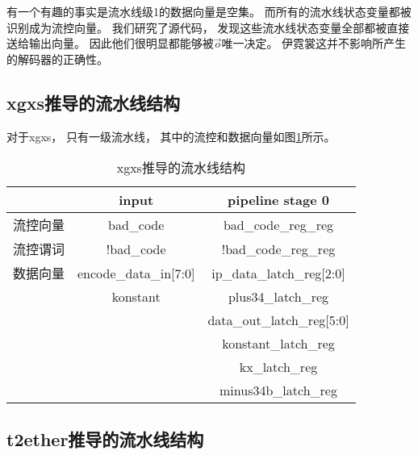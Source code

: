 有一个有趣的事实是流水线级1的数据向量是空集。
而所有的流水线状态变量都被识别成为流控向量。
我们研究了源代码，
发现这些流水线状态变量全部都被直接送给输出向量。
因此他们很明显都能够被$\vec{o}$唯一决定。
伊霓裳这并不影响所产生的解码器的正确性。



\subsection{xgxs推导的流水线结构}


对于xgxs，
只有一级流水线，
其中的流控和数据向量如图\ref{tab_xgxs}所示。

\begin{table}[b]
\centering
\caption{xgxs推导的流水线结构}
\begin{tabular}{|c|c|c|}
\hline
                       & input                  &  pipeline stage 0    \\\hline\hline
流控向量               &bad\_code               & bad\_code\_reg\_reg\\\hline
流控谓词               &!bad\_code              & !bad\_code\_reg\_reg \\\hline
数据向量               &encode\_data\_in[7:0]   &ip\_data\_latch\_reg[2:0] \\
                       &konstant                &plus34\_latch\_reg     \\
                       &                        &data\_out\_latch\_reg[5:0]\\
                       &                        &konstant\_latch\_reg   \\
                       &                        &kx\_latch\_reg         \\
                       &                        &minus34b\_latch\_reg   \\\hline
\end{tabular}\label{tab_xgxs}
\end{table}


\subsection{t2ether推导的流水线结构}


